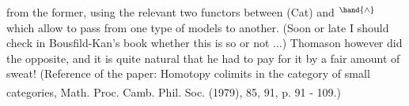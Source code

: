 
from the former,  using the relevant two functors between (Cat) and \hand{$\Delta$}$^{\hand{\wedge}}$
which allow to pass from one type of models to another. (Soon or late
I should check in Bousfild-Kan's book whether this is so or not ...)
Thomason however did the opposite,  and it is quite natural that he had
to pay for it by a fair amount of sweat!   (Reference of the paper:
Homotopy colimits in the category of small categories,  Math. Proc.
Camb. Phil. Soc. (1979)\textsuperscript{}, 85, 91,  p. 91 - 109.)

